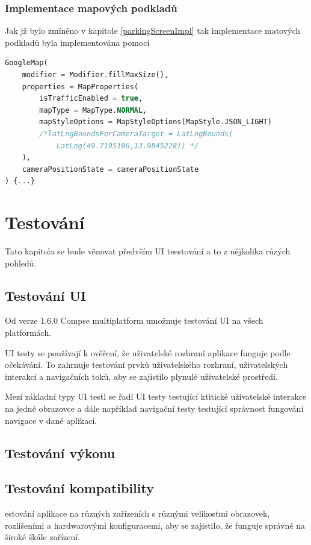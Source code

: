 \subsection{Implementace mapových podkladů}

Jak jž bylo zmíněno v kapitole \ref{parkingScreenImpl} tak implementace matových podkladů byla implementována pomocí 

\begin{lstlisting}[caption={Coil}, label={lst:Coil3}, language=SQL]
  GoogleMap(
    modifier = Modifier.fillMaxSize(),
    properties = MapProperties(
        isTrafficEnabled = true,
        mapType = MapType.NORMAL,
        mapStyleOptions = MapStyleOptions(MapStyle.JSON_LIGHT)
        /*latLngBoundsForCameraTarget = LatLngBounds(
            LatLng(49.7195186,13.9845228)) */
    ),
    cameraPositionState = cameraPositionState
) {...}
\end{lstlisting}




\chapter{Testování}
Tato kapitola se bude věnovat předvším UI teestování a to z nějkolika růzých pohledů. 

\section{Testování UI}
Od verze 1.6.0 Compse multiplatform umožnuje testování UI na všech platformách. \cite{composeNews1.6.0}

UI testy se používají k ověření, že uživatelské rozhraní aplikace funguje podle očekávání. To zahrnuje testování prvků uživatelského rozhraní, uživatelských 
interakcí a navigačních toků, aby se zajistilo plynulé uživatelské prostředí.

Mezi základní typy UI testl se řadí UI testy testující ktitické uživatelské interakce na jedné obrazovce a dále například navigační testy testující
správnost fungování navigace v dané aplikaci.


\section{Testování výkonu}


\section{Testování kompatibility}
estování aplikace na různých zařízeních s různými velikostmi obrazovek, rozlišeními a hardwarovými konfiguracemi, aby se zajistilo, že funguje 
správně na široké škále zařízení.




